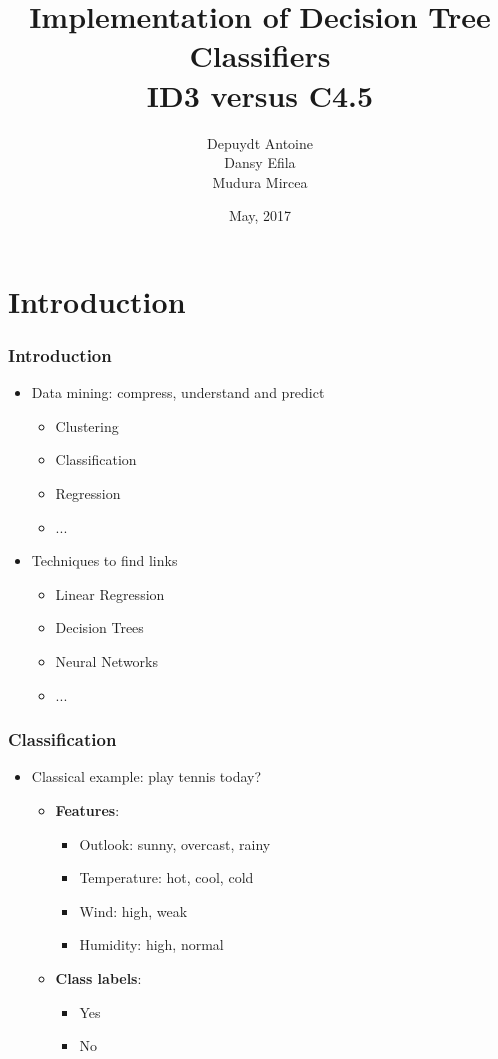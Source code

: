 \documentclass{beamer}
\title{Implementation of Decision Tree Classifiers\\
ID3 versus C4.5}
\author{Depuydt Antoine\\ Dansy Efila \\Mudura Mircea}
\date{May, 2017}
\begin{document}
\maketitle


\section{Introduction}
\begin{frame}
\frametitle{Introduction}
\begin{itemize}
\item Data mining: compress, understand and predict
	\vfill
	\begin{itemize}
		\item Clustering
		\vfill
		\item Classification
		\vfill
		\item Regression
		\vfill
		\item ...
	\end{itemize}
\vfill
\item Techniques to find links
	\vfill
	\begin{itemize}
		\item Linear Regression
		\vfill
		\item Decision Trees
		\vfill
		\item Neural Networks
		\vfill
		\item ...
	\end{itemize}
\end{itemize}
\end{frame}


\begin{frame}
\frametitle{Classification}
	\begin{itemize}
		\item Classical example: play tennis today?
		\vfill
		\begin{itemize}
			\item \textbf{Features}:
			\begin{itemize}
				\item Outlook: sunny, overcast, rainy
				\vfill
				\item Temperature: hot, cool, cold
				\vfill
				\item Wind: high, weak
				\vfill
				\item Humidity: high, normal
			\end{itemize}
			\vfill
			\item \textbf{Class labels}:
				\begin{itemize}
				\item Yes
				\vfill
				\item No
				\end{itemize}			

		\end{itemize}
	\end{itemize}
\end{frame}
\end{document}
